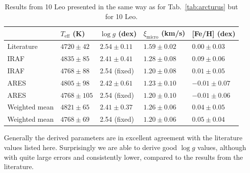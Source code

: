 \documentclass{aa}
\begin{document}
\begin{table}[htb!]
    \caption{Results from 10 Leo presented in the same way as for
             Tab.~\ref{tab:arcturus} but for 10 Leo.}
    \label{tab:10Leo}
    \centering
    \begin{tabular}{lllll}
      \hline\hline
                      & $T_\mathrm{eff}$ (K) &  $\log g$ (dex)  &   $\xi_\mathrm{micro}$ (km/s)   & [Fe/H] (dex)     \\
      \hline
        Literature    & $4720 \pm  42$       &  $2.54 \pm 0.11$ &    $1.59 \pm 0.02$              & $ 0.00 \pm 0.03$ \\
      \hline
        IRAF          & $4835 \pm  85$       &  $2.41 \pm 0.41$ &    $1.28 \pm 0.08$              & $ 0.09 \pm 0.06$ \\
        IRAF          & $4768 \pm  88$       &   2.54 (fixed)   &    $1.20 \pm 0.08$              & $ 0.01 \pm 0.05$ \\
      \hline
        ARES          & $4805 \pm  98$       &  $2.42 \pm 0.61$ &    $1.23 \pm 0.10$              & $-0.01 \pm 0.07$ \\
        ARES          & $4768 \pm 105$       &   2.54 (fixed)   &    $1.20 \pm 0.10$              & $-0.01 \pm 0.06$ \\
      \hline
        Weighted mean & $4821 \pm  65$       &  $2.41 \pm 0.37$ &    $1.26 \pm 0.06$              & $ 0.04 \pm 0.05$ \\
        Weighted mean & $4768 \pm  69$       &   2.54 (fixed)   &    $1.20 \pm 0.06$              & $ 0.05 \pm 0.04$ \\
      \hline
    \end{tabular}
\end{table}

Generally the derived parameters are in excellent agreement with the literature
values listed here. Surprisingly we are able to derive good $\log g$ values,
although with quite large errors and consistently lower, compared to the results
from the literature.
\end{document}
